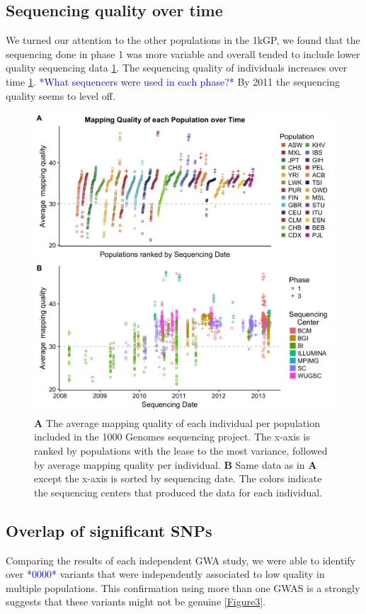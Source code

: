 \documentclass[9pt,lineno]{elife}
\newcommand{\todo}[1]{\textcolor{blue}{*#1*}}
\begin{document}
	\subsection{Sequencing quality over time}
We turned our attention to the other populations in the 1kGP, we found that the sequencing done in phase 1 was more variable and overall tended to include lower quality sequencing data \ref{MapQual}.
The sequencing quality of individuals increases over time \ref{MapQual}. 
\todo{What sequencers were used in each phase?}
By 2011 the sequencing quality seems to level off.
\begin{figure}
\includegraphics[width=\hsize,keepaspectratio]{MapQualOverTime.jpg}

\caption{\textbf{A} The average mapping quality of each individual per population included in the 1000 Genomes sequencing project. The x-axis is ranked by populations with the lease to the most variance, followed by average mapping quality per individual. \textbf{B} Same data as in \textbf{A} except the x-axis is sorted by sequencing date. The colors indicate the sequencing centers that produced the data for each individual.}
\label{MapQual}
\end{figure}

	\subsection{Overlap of significant SNPs}
Comparing the results of each independent GWA study, we were able to identify over \todo{0000} variants that were independently associated to low quality in multiple populations. This confirmation using more than one GWAS is a strongly suggests that these variants might not be genuine \ref{Figure3}. 
\end{document}
